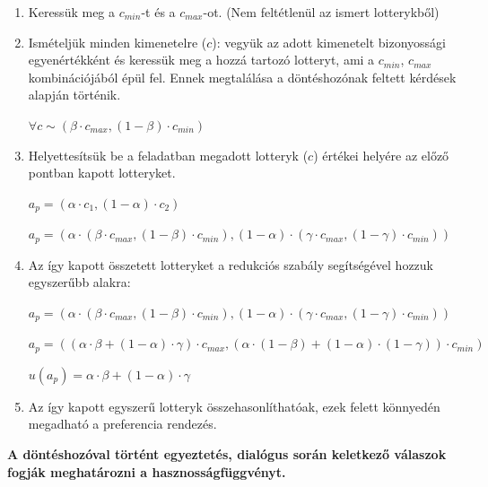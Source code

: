 \documentclass[a4paper,12pt]{article}
\begin{document}
\begin{enumerate}
\item Keressük meg a $c_{min}$-t és a $c_{max}$-ot. (Nem feltétlenül az ismert lotterykből)
\item Ismételjük minden kimenetelre ($c$): vegyük az adott kimenetelt bizonyossági egyenértékként és keressük meg a hozzá tartozó lotteryt, ami a $c_{min}$, $c_{max}$ kombinációjából épül fel. Ennek megtalálása a döntéshozónak feltett kérdések alapján történik.  

$\forall c \sim  (\beta \cdot c_{max},(1-\beta)\cdot c_{min})$
\item Helyettesítsük be a feladatban megadott lotteryk ($c$) értékei helyére az előző pontban kapott lotteryket. 

$a_p = (\alpha \cdot c_1, (1-\alpha) \cdot c_2 ) $

$a_p = (\alpha\cdot(\beta \cdot c_{max},(1-\beta)\cdot c_{min}), (1-\alpha) \cdot(\gamma\cdot c_{max},(1-\gamma)\cdot c_{min})) $

\item Az így kapott összetett lotteryket a redukciós szabály segítségével hozzuk egyszerűbb alakra: 

$a_p = (\alpha\cdot(\beta \cdot c_{max},(1-\beta)\cdot c_{min}), (1-\alpha) \cdot(\gamma\cdot c_{max},(1-\gamma)\cdot c_{min}) )$

$a_p = ((\alpha \cdot \beta + (1-\alpha) \cdot \gamma) \cdot c_{max} , (\alpha \cdot (1-\beta) + (1-\alpha) \cdot (1-\gamma) ) \cdot c_{min} ) $

$u(a_p) = \alpha \cdot \beta + (1-\alpha) \cdot \gamma$


\item Az így kapott egyszerű lotteryk összehasonlíthatóak, ezek felett könnyedén megadható a preferencia rendezés.
\end{enumerate}

\textbf{A döntéshozóval történt egyeztetés, dialógus során keletkező válaszok fogják meghatározni a hasznosságfüggvényt.}
\end{document}

